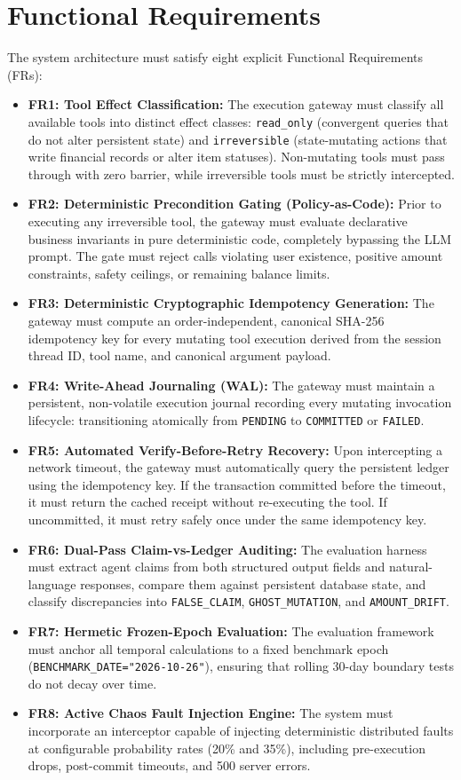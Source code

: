 \section{Functional Requirements}
\label{sec:req_functional}
The system architecture must satisfy eight explicit Functional Requirements (FRs):

\begin{itemize}
    \item \textbf{FR1: Tool Effect Classification:} The execution gateway must classify all available tools into distinct effect classes: \texttt{read\_only} (convergent queries that do not alter persistent state) and \texttt{irreversible} (state-mutating actions that write financial records or alter item statuses). Non-mutating tools must pass through with zero barrier, while irreversible tools must be strictly intercepted.
    \item \textbf{FR2: Deterministic Precondition Gating (Policy-as-Code):} Prior to executing any irreversible tool, the gateway must evaluate declarative business invariants in pure deterministic code, completely bypassing the LLM prompt. The gate must reject calls violating user existence, positive amount constraints, safety ceilings, or remaining balance limits.
    \item \textbf{FR3: Deterministic Cryptographic Idempotency Generation:} The gateway must compute an order-independent, canonical SHA-256 idempotency key for every mutating tool execution derived from the session thread ID, tool name, and canonical argument payload.
    \item \textbf{FR4: Write-Ahead Journaling (WAL):} The gateway must maintain a persistent, non-volatile execution journal recording every mutating invocation lifecycle: transitioning atomically from \texttt{PENDING} to \texttt{COMMITTED} or \texttt{FAILED}.
    \item \textbf{FR5: Automated Verify-Before-Retry Recovery:} Upon intercepting a network timeout, the gateway must automatically query the persistent ledger using the idempotency key. If the transaction committed before the timeout, it must return the cached receipt without re-executing the tool. If uncommitted, it must retry safely once under the same idempotency key.
    \item \textbf{FR6: Dual-Pass Claim-vs-Ledger Auditing:} The evaluation harness must extract agent claims from both structured output fields and natural-language responses, compare them against persistent database state, and classify discrepancies into \texttt{FALSE\_CLAIM}, \texttt{GHOST\_MUTATION}, and \texttt{AMOUNT\_DRIFT}.
    \item \textbf{FR7: Hermetic Frozen-Epoch Evaluation:} The evaluation framework must anchor all temporal calculations to a fixed benchmark epoch (\texttt{BENCHMARK\_DATE="2026-10-26"}), ensuring that rolling 30-day boundary tests do not decay over time.
    \item \textbf{FR8: Active Chaos Fault Injection Engine:} The system must incorporate an interceptor capable of injecting deterministic distributed faults at configurable probability rates (20\% and 35\%), including pre-execution drops, post-commit timeouts, and 500 server errors.
\end{itemize}

